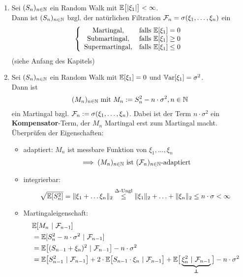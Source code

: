\begin{beisp}\
\begin{enumerate}[label=(\alph*)]
\item Sei $(S_n)_{n\in\mathbb{N}}$ ein Random Walk mit $\mathbb{E}\big[|\xi_1|\big]<\infty$.\\
Dann ist $(S_n)_{n\in\mathbb{N}}$ bzgl. der natürlichen Filtration $\mathcal{F}_n=\sigma(\xi_1,\ldots,\xi_n)$ ein
\begin{align*}
\left\lbrace\begin{array}{cl}
\text{Martingal}, & \text{falls } \mathbb{E}[\xi_1]=0\\
\text{Submartingal}, & \text{falls } \mathbb{E}[\xi_1]\geq0\\
\text{Supermartingal}, & \text{falls } \mathbb{E}[\xi_1]\leq0\\
\end{array}\right.
\end{align*}
(siehe Anfang des Kapitels)
\item Sei $(S_n)_{n\in\mathbb{N}}$ ein Random Walk mit $\mathbb{E}[\xi_1]=0$ und $\mathbb{V}\text{ar}[\xi_1]=\sigma^2$.\\
Dann ist 
\begin{align*}
(M_n)_{n\in\mathbb{N}}\text{ mit } M_n:=S_n^2-n\cdot\sigma^2,n\in\mathbb{N}
\end{align*}
ein Martingal bzgl. $\mathcal{F}_n:=\sigma(\xi_1,\ldots,\xi_n)$. Dabei ist der Term $n\cdot\sigma^2$ ein \textbf{Kompensator}-Term, der $M_n$ Martingal erst zum Martingal macht. Überprüfen der Eigenschaften:
\begin{itemize}
\item adaptiert: $M_n$ ist messbare Funktion von $\xi_1,\ldots,\xi_n$
\begin{align*}
	\implies(M_n)_{n\in\mathbb{N}} \text{ ist } (\mathcal{F}_n)_{n\in\mathbb{N}}\text{-adaptiert}
\end{align*}
\item integrierbar: \begin{align*}
\sqrt{\mathbb{E}[S_n^2]}=\Vert\xi_1+\ldots\xi_n\Vert_2\stackrel{\Delta\text{-Ungl}}{\leq}\Vert\xi_1\Vert_2+\ldots+\Vert\xi_n\Vert_2\leq n\cdot\sigma<\infty
\end{align*}
\item Martingaleigenschaft:
\begin{align*}
&\E[M_n~|~\F_{n-1}]\\
&=\E[S_n^2-n\cdot\sigma^2~|~\F_{n-1}]\\
&=\E\big[(S_{n-1}+\xi_n)^2~|~\F_{n-1}\big]-n\cdot\sigma^2\\
&=\E\big[S_{n-1}^2~|~\F_{n-1}\big]+2\cdot\E\big[S_{n-1}\cdot\xi_n~|~\F_{n-1}\big]+\E\big[\underbrace{\xi_n^2~|~\F_{n-1}}_{\unab}\big]-n\cdot\sigma^2\\

\end{align*}
\end{itemize}
\end{enumerate}
\end{beisp}
